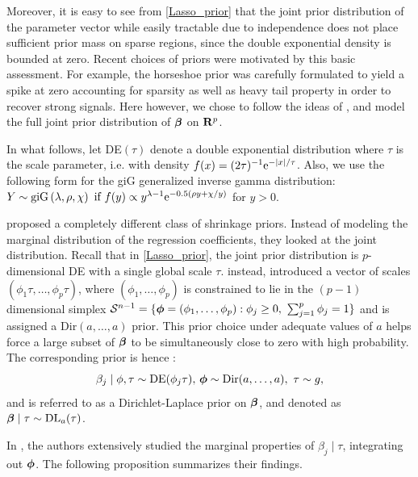 \documentclass[10pt]{article}
\begin{document}
Moreover, it is easy to see from \eqref{Lasso_prior} that the joint prior distribution of the parameter vector while easily tractable due to independence does not place sufficient prior mass on sparse regions, since the double exponential density is bounded at zero. Recent choices of priors were motivated by this basic assessment. For example, the horseshoe prior was carefully formulated to yield a spike at zero accounting for sparsity as well as heavy tail property in order to recover strong signals. Here however, we chose to follow the ideas of \citep{bhattacharya2014dirichlet}, and model the full joint prior distribution of $\boldsymbol{\beta}$ on ${\bf R}^p$.

In what follows, let \rm{DE}$(\tau )$ denote a double exponential distribution where $\tau$ is the scale parameter, \rm{i.e.}  with density $f(x) = (2\tau)^{-1} {\rm e}^{-\lvert x\rvert/ \tau }$. Also, we use the following form for the \rm{giG} generalized inverse gamma distribution: $Y\sim\text{\rm{giG}} \left(\lambda,\rho , \chi \right) \text{ if } f(y) \propto y^{\lambda - 1} {\rm e}^{-0.5 \left( \rho y + \chi /y \right) }  $ for $y > 0$.

\cite{bhattacharya2014dirichlet} proposed a completely different class of shrinkage priors. Instead of modeling the marginal distribution of the regression coefficients, they looked at the joint distribution. Recall that in \ref{Lasso_prior}, the joint prior distribution is $p$-dimensional \rm{DE} with a single global scale $\tau$. \cite{bhattacharya2014dirichlet} instead, introduced a vector of scales $\left( \phi_1 \tau , \ldots , \phi_p \tau \right)$, where $ \left( \phi_1 , \ldots , \phi_p \right) $ is constrained to lie in the $ (p - 1) $ dimensional simplex $\mathcal{S}^{n-1} = \{ \boldsymbol{\phi} = (\phi_1 , \ldots , \phi_p ) : \phi_j \geq 0, \ \sum_{j = 1}^{p} \phi_j = 1 \}$ and is assigned a \rm{Dir}$(a, \ldots ,a)$ prior. This prior choice under adequate values of $a$ helps force a large subset of $\boldsymbol{\beta}$ to be simultaneously close to zero with high probability. The corresponding prior is hence :$$ \beta_j \mid \phi , \tau \sim \text{\rm{DE}}(\phi_j \tau), \, \boldsymbol{\phi} \sim \text{\rm{Dir}}(a, \ldots ,a), \ \tau \sim g, $$ and is referred to as a Dirichlet-Laplace prior on $\boldsymbol{\beta}$, and denoted as $\boldsymbol{\beta} \mid \tau \sim \text{\rm{DL}}_a(\tau)$.

In \citep{bhattacharya2014dirichlet}, the authors extensively studied the marginal properties of $\beta_j \mid \tau$, integrating out $\boldsymbol{\phi}$. The following proposition summarizes their findings.
\end{document}
